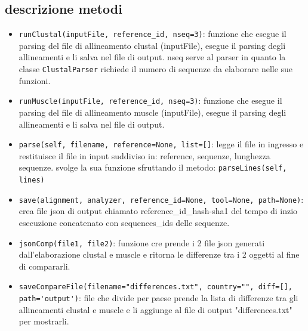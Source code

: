 \documentclass[11pt,italian]{article}
\begin{document}
\subsection{descrizione metodi}
\begin{itemize}
  \item \lstinline{runClustal(inputFile, reference_id, nseq=3)}: funzione che esegue il parsing del file di allineamento clustal (inputFile), esegue il parsing degli allineamenti e li salva nel file di output. \newline nseq serve al parser in quanto la classe \lstinline{ClustalParser} richiede il numero di sequenze da elaborare nelle sue funzioni.

  \item \lstinline{runMuscle(inputFile, reference_id, nseq=3)}: funzione che esegue il parsing del file di allineamento muscle (inputFile), esegue il parsing degli allineamenti e li salva nel file di output. \newline

  \item \lstinline{parse(self, filename, reference=None, list=[]}:  legge il file in ingresso e restituisce il file in input suddiviso in: reference, sequenze, lunghezza sequenze. svolge la sua funzione sfruttando il metodo: \lstinline{parseLines(self, lines)}

  \item \lstinline{save(alignment, analyzer, reference_id=None, tool=None, path=None)}: crea file json di output chiamato reference\_id\_hash-sha1 del tempo di inzio esecuzione concatenato con sequences\_ids delle sequenze.

  \item \lstinline{jsonComp(file1, file2)}: funzione cre prende i 2 file json generati dall'elaborazione clustal e muscle e ritorna le differenze tra i 2 oggetti al fine di compararli.

  \item \lstinline{saveCompareFile(filename="differences.txt", country="", diff=[], path='output')}: file che divide per paese prende la lista di differenze tra gli allineamenti clustal e muscle e li aggiunge al file di output "differences.txt" per mostrarli.
\end{itemize}
\end{document}
